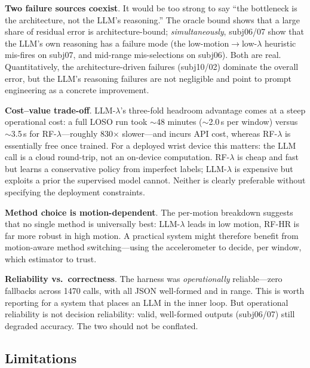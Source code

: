 \documentclass[sigconf,nonacm,11pt]{acmart}
\begin{document}
\textbf{Two failure sources coexist}. It would be too strong to say ``the bottleneck is the architecture, not the LLM's reasoning.'' The oracle bound shows that a large share of residual error is architecture-bound; \emph{simultaneously}, subj06/07 show that the LLM's own reasoning has a failure mode (the low-motion$\to$low-$\lambda$ heuristic mis-fires on subj07, and mid-range mis-selections on subj06). Both are real. Quantitatively, the architecture-driven failures (subj10/02) dominate the overall error, but the LLM's reasoning failures are not negligible and point to prompt engineering as a concrete improvement.

\textbf{Cost--value trade-off}. LLM-$\lambda$'s three-fold headroom advantage comes at a steep operational cost: a full LOSO run took $\sim$48 minutes ($\sim$2.0\,s per window) versus $\sim$3.5\,s for RF-$\lambda$---roughly 830$\times$ slower---and incurs API cost, whereas RF-$\lambda$ is essentially free once trained. For a deployed wrist device this matters: the LLM call is a cloud round-trip, not an on-device computation. RF-$\lambda$ is cheap and fast but learns a conservative policy from imperfect labels; LLM-$\lambda$ is expensive but exploits a prior the supervised model cannot. Neither is clearly preferable without specifying the deployment constraints.

\textbf{Method choice is motion-dependent}. The per-motion breakdown suggests that no single method is universally best: LLM-$\lambda$ leads in low motion, RF-HR is far more robust in high motion. A practical system might therefore benefit from motion-aware method switching---using the accelerometer to decide, per window, which estimator to trust.

\textbf{Reliability vs.\ correctness}. The harness was \emph{operationally} reliable---zero fallbacks across 1470 calls, with all JSON well-formed and in range. This is worth reporting for a system that places an LLM in the inner loop. But operational reliability is not decision reliability: valid, well-formed outputs (subj06/07) still degraded accuracy. The two should not be conflated.

\subsection*{Limitations}
\end{document}
